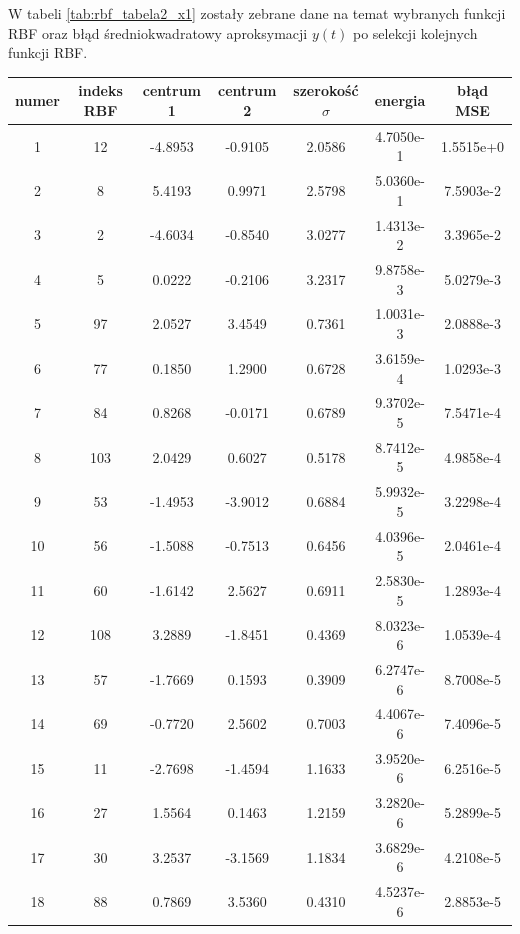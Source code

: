 W tabeli \ref{tab:rbf_tabela2_x1} zostały zebrane dane na temat wybranych funkcji RBF oraz błąd średniokwadratowy aproksymacji $y(t)$ po selekcji kolejnych funkcji RBF.

\begin{table}[ht!]
\centering

\begin{tabular}{ |c| c| c| c| c| c| c| }
\hline
numer & indeks RBF & centrum 1 & centrum 2 & szerokość $\sigma$ & energia      & błąd MSE    \\ \hline    
    1 &  12 &  -4.8953 &  -0.9105 &   2.0586  &  4.7050e-1 & 1.5515e+0 \\
    2 &   8 &   5.4193 &   0.9971 &   2.5798  &  5.0360e-1 & 7.5903e-2 \\
    3 &   2 &  -4.6034 &  -0.8540 &   3.0277  &  1.4313e-2 & 3.3965e-2 \\
    4 &   5 &   0.0222 &  -0.2106 &   3.2317  &  9.8758e-3 & 5.0279e-3 \\
    5 &  97 &   2.0527 &   3.4549 &   0.7361  &  1.0031e-3 & 2.0888e-3 \\
    6 &  77 &   0.1850 &   1.2900 &   0.6728  &  3.6159e-4 & 1.0293e-3 \\
    7 &  84 &   0.8268 &  -0.0171 &   0.6789  &  9.3702e-5 & 7.5471e-4 \\
    8 & 103 &   2.0429 &   0.6027 &   0.5178  &  8.7412e-5 & 4.9858e-4 \\
    9 &  53 &  -1.4953 &  -3.9012 &   0.6884  &  5.9932e-5 & 3.2298e-4 \\
   10 &  56 &  -1.5088 &  -0.7513 &   0.6456  &  4.0396e-5 & 2.0461e-4 \\
   11 &  60 &  -1.6142 &   2.5627 &   0.6911  &  2.5830e-5 & 1.2893e-4 \\
   12 & 108 &   3.2889 &  -1.8451 &   0.4369  &  8.0323e-6 & 1.0539e-4 \\
   13 &  57 &  -1.7669 &   0.1593 &   0.3909  &  6.2747e-6 & 8.7008e-5 \\
   14 &  69 &  -0.7720 &   2.5602 &   0.7003  &  4.4067e-6 & 7.4096e-5 \\
   15 &  11 &  -2.7698 &  -1.4594 &   1.1633  &  3.9520e-6 & 6.2516e-5 \\
   16 &  27 &   1.5564 &   0.1463 &   1.2159  &  3.2820e-6 & 5.2899e-5 \\
   17 &  30 &   3.2537 &  -3.1569 &   1.1834  &  3.6829e-6 & 4.2108e-5 \\
   18 &  88 &   0.7869 &   3.5360 &   0.4310  &  4.5237e-6 & 2.8853e-5 \\

\end{tabular}
\end{table}
